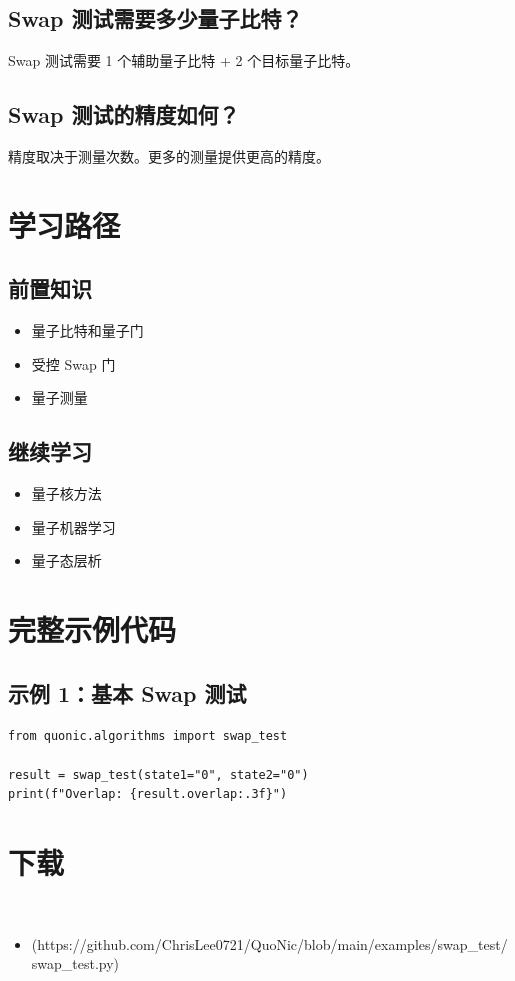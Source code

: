\documentclass[12pt,a4paper]{article}
\begin{document}
\subsection{Swap 测试需要多少量子比特？}

Swap 测试需要 1 个辅助量子比特 + 2 个目标量子比特。

\subsection{Swap 测试的精度如何？}

精度取决于测量次数。更多的测量提供更高的精度。

\section{学习路径}

\subsection{前置知识}
\begin{itemize}
  \item 量子比特和量子门
  \item 受控 Swap 门
  \item 量子测量
\end{itemize}

\subsection{继续学习}
\begin{itemize}
  \item 量子核方法
  \item 量子机器学习
  \item 量子态层析
\end{itemize}

\section{完整示例代码}

\subsection{示例 1：基本 Swap 测试}

\begin{lstlisting}[style=python]
from quonic.algorithms import swap_test

result = swap_test(state1="0", state2="0")
print(f"Overlap: {result.overlap:.3f}")
\end{lstlisting}


\section{下载}

\begin{itemize}
  \item [swap_test.py](https://github.com/ChrisLee0721/QuoNic/blob/main/examples/swap_test/swap_test.py)
\end{itemize}
\end{document}
